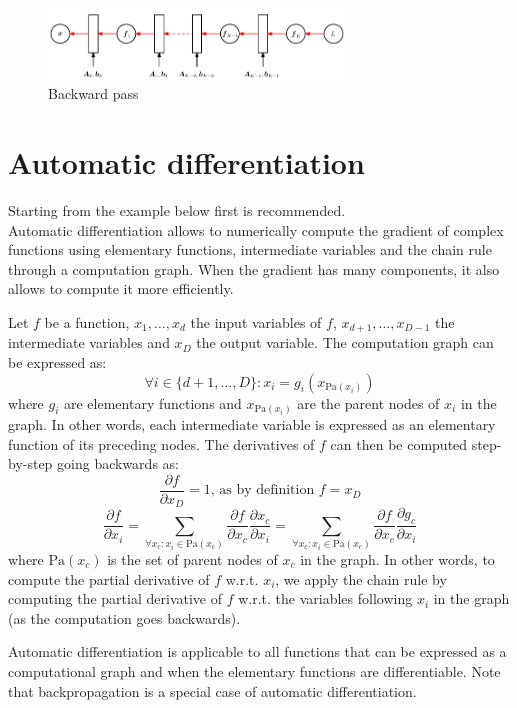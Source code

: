\begin{figure}[ht]
    \centering
    \includegraphics[width=0.7\textwidth]{img/_backward_pass.pdf}
    \caption{Backward pass}
\end{figure}



\section{Automatic differentiation}
Starting from the example below first is recommended.\\

Automatic differentiation allows to numerically compute 
the gradient of complex functions using elementary functions, intermediate variables and the chain rule through a computation graph.
When the gradient has many components, it also allows to compute it more efficiently.

Let $f$ be a function,
$x_1, \dots, x_d$ the input variables of $f$,
$x_{d+1}, \dots, x_{D-1}$ the intermediate variables and
$x_D$ the output variable.
The computation graph can be expressed as:
\[
    \forall i \in \{ d+1, \dots, D \}: x_i = g_i(x_{\text{Pa}(x_i)})
\]
where $g_i$ are elementary functions and $x_{\text{Pa}(x_i)}$ are the parent nodes of $x_i$ in the graph.
In other words, each intermediate variable is expressed as an elementary function of its preceding nodes.
The derivatives of $f$ can then be computed step-by-step going backwards as:
\[ \frac{\partial f}{\partial x_D} = 1 \text{, as by definition } f = x_D \]
\[ 
    \frac{\partial f}{\partial x_i} = \sum_{\forall x_c: x_i \in \text{Pa}(x_c)} \frac{\partial f}{\partial x_c} \frac{\partial x_c}{\partial x_i}
        = \sum_{\forall x_c: x_i \in \text{Pa}(x_c)} \frac{\partial f}{\partial x_c} \frac{\partial g_c}{\partial x_i}
\]
where $\text{Pa}(x_c)$ is the set of parent nodes of $x_c$ in the graph.
In other words, to compute the partial derivative of $f$ w.r.t. $x_i$, 
we apply the chain rule by computing 
the partial derivative of $f$ w.r.t. the variables following $x_i$ in the graph (as the computation goes backwards).

Automatic differentiation is applicable to all functions that can be expressed as a computational graph and 
when the elementary functions are differentiable.
Note that backpropagation is a special case of automatic differentiation.

